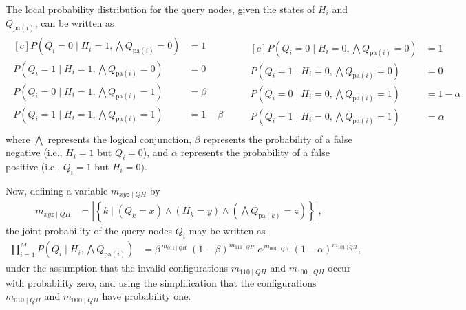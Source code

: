 The local probability distribution for the query nodes, given the states of
$H_i$ and $Q_{\text{pa}(i)}$, can be written as
%
\begin{align*}
    \begin{aligned}[c]
        P\left(Q_i = 0 \mid H_i = 1, \bigwedge Q_{\text{pa}(i)} = 0\right) &= 1 \\
        P\left(Q_i = 1 \mid H_i = 1, \bigwedge Q_{\text{pa}(i)} = 0\right) &= 0 \\
        P\left(Q_i = 0 \mid H_i = 1, \bigwedge Q_{\text{pa}(i)} = 1\right) &= \beta \\
        P\left(Q_i = 1 \mid H_i = 1, \bigwedge Q_{\text{pa}(i)} = 1\right) &= 1 - \beta \\
    \end{aligned}
    \qquad
    \begin{aligned}[c]
        P\left(Q_i = 0 \mid H_i = 0, \bigwedge Q_{\text{pa}(i)} = 0\right) &= 1 \\
        P\left(Q_i = 1 \mid H_i = 0, \bigwedge Q_{\text{pa}(i)} = 0\right) &= 0 \\
        P\left(Q_i = 0 \mid H_i = 0, \bigwedge Q_{\text{pa}(i)} = 1\right) &= 1 - \alpha \\
        P\left(Q_i = 1 \mid H_i = 0, \bigwedge Q_{\text{pa}(i)} = 1\right) &= \alpha
    \end{aligned}
\end{align*}
%
where $\bigwedge$ represents the logical conjunction, $\beta$ represents the
probability of a false negative (i.e., $H_i = 1$ but $Q_i = 0$), and $\alpha$
represents the probability of a false positive (i.e., $Q_i = 1$ but $H_i = 0)$.

Now, defining a variable $m_{xyz\mid QH}$ by
%
\begin{align*}
    m_{xyz\mid QH} 
    &= \left| 
        \left\{k \mid
        \left(
            Q_k = x 
        \right) \wedge  \left(
            H_k = y
        \right) \wedge  \left(
            \bigwedge Q_{\text{pa}(k)} = z
        \right)
        \right\}
    \right|,
\end{align*}
%
the joint probability of the query nodes $Q_i$ may be written as
%
\begin{align*}
    \prod_{i=1}^M P\left(Q_i \mid H_i, \bigwedge Q_{\text{pa}(i)}\right)
    &=  \beta^{\,m_{011\mid QH}}
    \;(1 - \beta)^{m_{111\mid QH}}
    \;\alpha^{m_{001\mid QH}}
    \;(1 - \alpha)^{m_{101\mid QH}},
\end{align*}
under the assumption that the invalid configurations $m_{110\mid QH}$ and
$m_{100\mid QH}$ occur with probability zero,
%
and using the simplification that the configurations $m_{010\mid QH}$ and
$m_{000\mid QH}$ have probability one.


